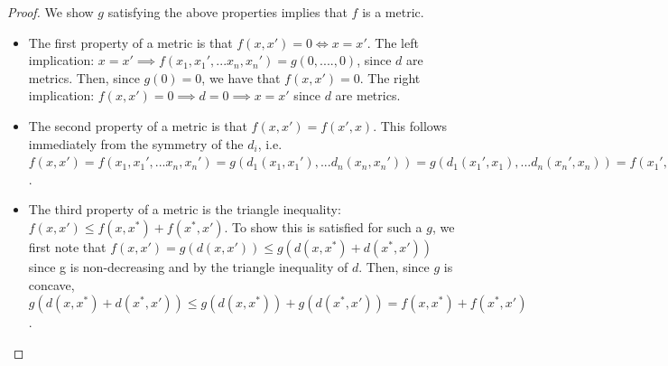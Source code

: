 \begin{proof}
We show $g$ satisfying the above properties implies that $f$ is a metric.
\begin{itemize}
    \item The first property of a metric is that $f(x,x') = 0 \Longleftrightarrow x = x'$.  The left implication: $x = x' \implies f(x_1, x_1', ... x_n, x_n') = g(0,....,0)$, since $d$ are metrics.  Then, since $g(0) = 0$, we have that $f(x,x') = 0$. The right implication: $f(x,x') = 0 \implies  d = 0 \implies x = x'$ since $d$ are metrics.
    \item The second property of a metric is that $f(x,x') = f(x',x)$. This follows immediately from the symmetry of the $d_i$, i.e. $f(x,x') = f(x_1, x_1', ... x_n, x_n') = g(d_1(x_1, x_1'), ... d_n(x_n, x_n')) = g(d_1(x_1', x_1), ... d_n(x_n', x_n)) =  f(x_1', x_1, ... x_n', x_n) = f(x',x)$.
    \item The third property of a metric is the triangle inequality: $f(x, x') \leq f(x, x^*) +  f(x^*, x') $.  To show this is satisfied for such a $g$, we first note that $f(x,x') = g(d(x,x')) \leq g(d(x, x^*) + d(x^*, x')) $ since g is non-decreasing and by the triangle inequality of $d$. Then, since $g$ is concave, $g(d(x, x^*) + d(x^*, x')) \leq g(d(x, x^*)) + g(d(x^*, x')) = f(x,x^*) + f(x^*, x')$.

\end{itemize}


\end{proof}

